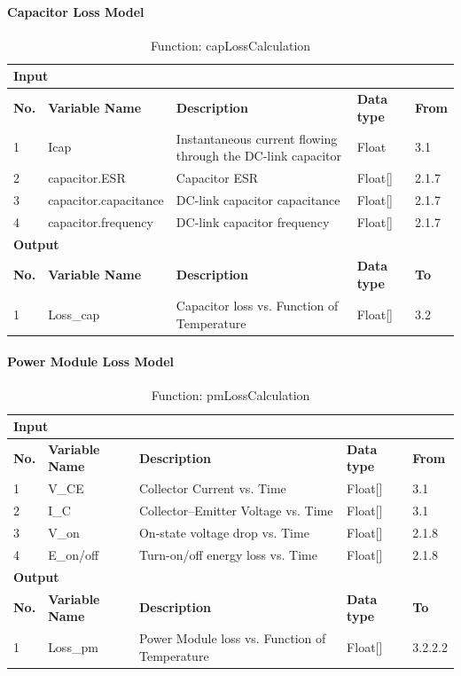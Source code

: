 \documentclass{article}
\begin{document}
\paragraph{Capacitor Loss Model}
\begin{table}[h]
\centering
\caption{Function: capLossCalculation}
\begin{tabular}{|l|l|p{6cm}|l|l|}
\hline
\multicolumn{5}{|l|}{\textbf{Input}} \\ \hline
\textbf{No.} & \textbf{Variable Name} & \textbf{Description} & \textbf{Data type} & \textbf{From} \\ \hline
1 & Icap & Instantaneous current flowing through the DC-link capacitor & Float & 3.1 \\ \hline
2 & capacitor.ESR & Capacitor ESR & Float[] & 2.1.7 \\ \hline
3 & capacitor.capacitance & DC-link capacitor capacitance & Float[] & 2.1.7 \\ \hline
4 & capacitor.frequency & DC-link capacitor frequency & Float[] & 2.1.7 \\ \hline
\multicolumn{5}{|l|}{\textbf{Output}} \\ \hline
\textbf{No.} & \textbf{Variable Name} & \textbf{Description} & \textbf{Data type} & \textbf{To} \\ \hline
1 & Loss\_cap & Capacitor loss vs. Function of Temperature & Float[] & 3.2 \\ \hline
\end{tabular}
\end{table}

\paragraph{Power Module Loss Model}
\begin{table}[h]
\centering
\caption{Function: pmLossCalculation}
\begin{tabular}{|l|l|p{6cm}|l|l|}
\hline
\multicolumn{5}{|l|}{\textbf{Input}} \\ \hline
\textbf{No.} & \textbf{Variable Name} & \textbf{Description} & \textbf{Data type} & \textbf{From} \\ \hline
1 & V\_CE & Collector Current vs. Time & Float[] & 3.1 \\ \hline
2 & I\_C & Collector–Emitter Voltage vs. Time & Float[] & 3.1 \\ \hline
3 & V\_on & On-state voltage drop vs. Time & Float[] & 2.1.8 \\ \hline
4 & E\_on/off & Turn-on/off energy loss vs. Time & Float[] & 2.1.8 \\ \hline
\multicolumn{5}{|l|}{\textbf{Output}} \\ \hline
\textbf{No.} & \textbf{Variable Name} & \textbf{Description} & \textbf{Data type} & \textbf{To} \\ \hline
1 & Loss\_pm & Power Module loss vs. Function of Temperature & Float[] & 3.2.2.2 \\ \hline
\end{tabular}
\end{table}
\end{document}
